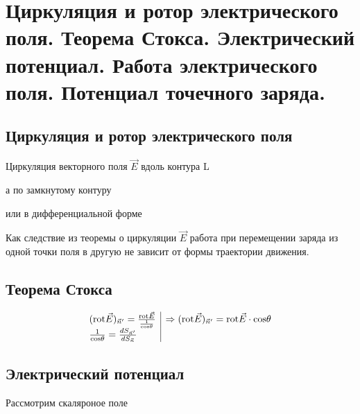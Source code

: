 \section{Циркуляция и ротор электрического поля. Теорема Стокса. Электрический
потенциал. Работа электрического поля. Потенциал точечного заряда.}

\subsection*{Циркуляция и ротор электрического поля}

Циркуляция векторного поля $\vec{E}$ вдоль контура L


а по замкнутому контуру


или в дифференциальной форме 



Как следствие из теоремы о циркуляции $\vec{E}$ работа при перемещении
заряда из одной точки поля в другую не зависит от формы траектории движения.

\subsection*{Теорема Стокса}


 
\[\begin{array}{l|l}
    (\mathrm{rot}\vec{E})_{\vec{n}'}=\frac{\mathrm{rot}\vec{E}}{\frac{1}{\mathrm{cos}\theta}} & \Rightarrow (\mathrm{rot}\vec{E})_{\vec{n}'}=\mathrm{rot}\vec{E}\cdot\mathrm{cos}\theta\\
    \frac{1}{\mathrm{cos}\theta}=\frac{dS_{\vec{n}'}}{dS_{\vec{n}}} &
\end{array}
\]

\subsection*{Электрический потенциал}

Рассмотрим скаляроное поле



